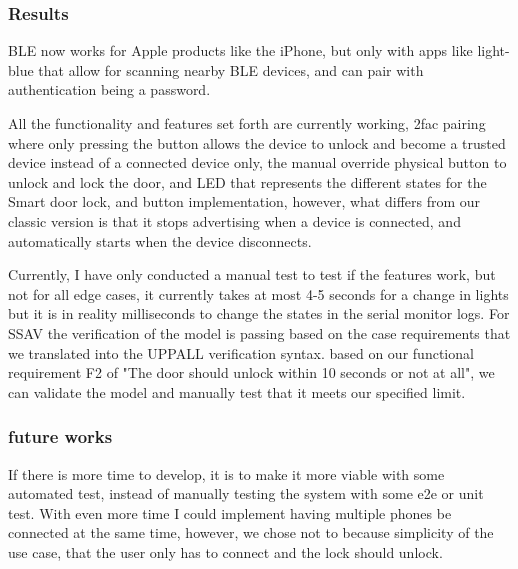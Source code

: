 \subsubsection{\textbf{Results}} 
BLE now works for Apple products like the iPhone, but only with apps like light-blue that allow for scanning nearby BLE devices, and can pair with authentication being a password.

All the functionality and features set forth are currently working, 2fac pairing where only pressing the button allows the device to unlock and become a trusted device instead of a connected device only, the manual override physical button to unlock and lock the door, and LED that represents the different states for the Smart door lock, and button implementation, however, what differs from our classic version is that it stops advertising when a device is connected, and automatically starts when the device disconnects.

Currently, I have only conducted a manual test to test if the features work, but not for all edge cases, it currently takes at most 4-5 seconds for a change in lights but it is in reality milliseconds to change the states in the serial monitor logs. For SSAV the verification of the model is passing based on the case requirements that we translated into the UPPALL verification syntax. based on our functional requirement F2 of "The door should unlock within 10 seconds or not at all", we can validate the model and manually test that it meets our specified limit. 

\subsubsection{\textbf{future works}} 
If there is more time to develop, it is to make it more viable with some automated test, instead of manually testing the system with some e2e or unit test. With even more time I could implement having multiple phones be connected at the same time, however, we chose not to because simplicity of the use case, that the user only has to connect and the lock should unlock.